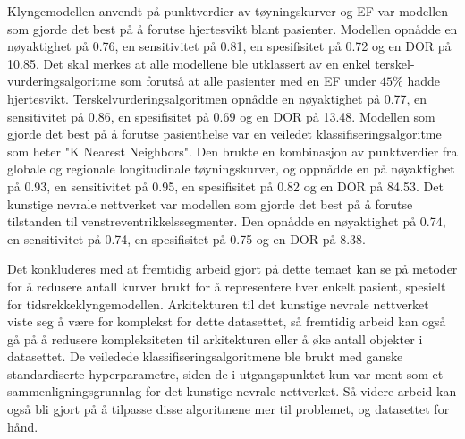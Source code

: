 Klyngemodellen anvendt på punktverdier av tøyningskurver og EF var modellen som gjorde det best på å forutse hjertesvikt blant pasienter. Modellen opnådde en nøyaktighet på 0.76, en sensitivitet på 0.81, en spesifisitet på 0.72 og en DOR på 10.85. Det skal merkes at alle modellene ble utklassert av en enkel terskel-vurderingsalgoritme som forutså at alle pasienter med en EF under $45\%$ hadde hjertesvikt. Terskelvurderingsalgoritmen opnådde en nøyaktighet på 0.77, en sensitivitet på 0.86, en spesifisitet på 0.69 og en DOR på 13.48. Modellen som gjorde det best på å forutse pasienthelse var en veiledet klassifiseringsalgoritme som heter "K Nearest Neighbors". Den brukte en kombinasjon av punktverdier fra globale og regionale longitudinale tøyningskurver, og oppnådde en på nøyaktighet på 0.93, en sensitivitet på 0.95, en spesifisitet på 0.82 og en DOR på 84.53. Det kunstige nevrale nettverket var modellen som gjorde det best på å forutse tilstanden til venstreventrikkelssegmenter. Den opnådde en nøyaktighet på 0.74, en sensitivitet på 0.74, en spesifisitet på 0.75 og en DOR på 8.38. \bigskip

Det konkluderes med at fremtidig arbeid gjort på dette temaet kan se på metoder for å redusere antall kurver brukt for å representere hver enkelt pasient, spesielt for tidsrekkeklyngemodellen. Arkitekturen til det kunstige nevrale nettverket viste seg å være for komplekst for dette datasettet, så fremtidig arbeid kan også gå på å redusere kompleksiteten til arkitekturen eller å øke antall objekter i datasettet. De veiledede klassifiseringsalgoritmene ble brukt med ganske standardiserte hyperparametre, siden de i utgangspunktet kun var ment som et sammenligningsgrunnlag for det kunstige nevrale nettverket. Så videre arbeid kan også bli gjort på å tilpasse disse algoritmene mer til problemet, og datasettet for hånd.

\clearpage